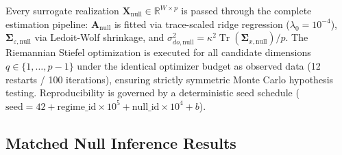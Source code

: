 \documentclass[12pt]{article}
\begin{document}
Every surrogate realization $\mathbf{X}_{\text{null}} \in \mathbb{R}^{W \times p}$ is passed through the complete estimation pipeline: $\hat{\mathbf{A}}_{\text{null}}$ is fitted via trace-scaled ridge regression ($\lambda_0 = 10^{-4}$), $\boldsymbol{\Sigma}_{\varepsilon,\text{null}}$ via Ledoit-Wolf shrinkage, and $\sigma_{do,\text{null}}^2 = \kappa^2 \operatorname{Tr}(\boldsymbol{\Sigma}_{x,\text{null}})/p$. The Riemannian Stiefel optimization is executed for all candidate dimensions $q \in \{1, \dots, p-1\}$ under the identical optimizer budget as observed data (12 restarts / 100 iterations), ensuring strictly symmetric Monte Carlo hypothesis testing. Reproducibility is governed by a deterministic seed schedule ($\text{seed} = 42 + \text{regime\_id} \times 10^5 + \text{null\_id} \times 10^4 + b$).

\subsection{Matched Null Inference Results}
\end{document}
